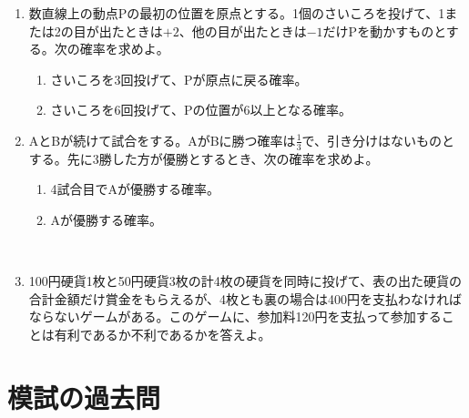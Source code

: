\documentclass[10pt,a4paper,fleqn]{jsarticle}
\begin{document}
\begin{enumerate}
\item 数直線上の動点Pの最初の位置を原点とする。1個のさいころを投げて、1または2の目が出たときは$+2$、他の目が出たときは$-1$だけPを動かすものとする。次の確率を求めよ。
\begin{enumerate}[(1)]
\item さいころを3回投げて、Pが原点に戻る確率。
\item さいころを6回投げて、Pの位置が6以上となる確率。\newpage
\end{enumerate} 

\item AとBが続けて試合をする。AがBに勝つ確率は$\displaystyle \frac{1}{3}$で、引き分けはないものとする。先に3勝した方が優勝とするとき、次の確率を求めよ。
\begin{enumerate}[(1)]
\item 4試合目でAが優勝する確率。
\item Aが優勝する確率。
\end{enumerate}\

\item 100円硬貨1枚と50円硬貨3枚の計4枚の硬貨を同時に投げて、表の出た硬貨の合計金額だけ賞金をもらえるが、4枚とも裏の場合は400円を支払わなければならないゲームがある。このゲームに、参加料120円を支払って参加することは有利であるか不利であるかを答えよ。\newpage

\end{enumerate}

\section{模試の過去問}
\end{document}
